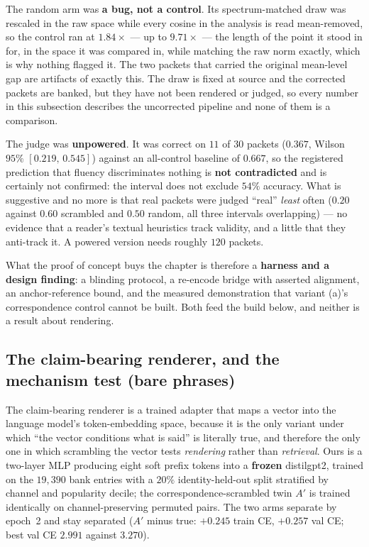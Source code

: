 \documentclass[11pt]{article}
\begin{document}
The random arm was \textbf{a bug, not a control}. Its spectrum-matched draw was rescaled in the raw
space while every cosine in the analysis is read mean-removed, so the control ran at $1.84\times$ ---
up to $9.71\times$ --- the length of the point it stood in for, in the space it was compared in, while
matching the raw norm exactly, which is why nothing flagged it. The two packets that carried the
original mean-level gap are artifacts of exactly this. The draw is fixed at source and the corrected
packets are banked, but they have not been rendered or judged, so every number in this subsection
describes the uncorrected pipeline and none of them is a comparison.

The judge was \textbf{unpowered}. It was correct on $11$ of $30$ packets ($0.367$, Wilson $95\%$
$[0.219,\,0.545]$) against an all-control baseline of $0.667$, so the registered prediction that
fluency discriminates nothing is \textbf{not contradicted} and is certainly not confirmed: the
interval does not exclude $54\%$ accuracy. What is suggestive and no more is that real packets were
judged ``real'' \emph{least} often ($0.20$ against $0.60$ scrambled and $0.50$ random, all three
intervals overlapping) --- no evidence that a reader's textual heuristics track validity, and a little
that they anti-track it. A powered version needs roughly $120$ packets.

What the proof of concept buys the chapter is therefore a \textbf{harness and a design finding}: a
blinding protocol, a re-encode bridge with asserted alignment, an anchor-reference bound, and the
measured demonstration that variant (a)'s correspondence control cannot be built. Both feed the build
below, and neither is a result about rendering.

\subsection{The claim-bearing renderer, and the mechanism test (bare phrases)}
\label{sec:c3b1}

The claim-bearing renderer is a trained adapter that maps a vector into the language model's
token-embedding space, because it is the only variant under which ``the vector conditions what is
said'' is literally true, and therefore the only one in which scrambling the vector tests
\emph{rendering} rather than \emph{retrieval}. Ours is a two-layer MLP producing eight soft prefix
tokens into a \textbf{frozen} distilgpt2, trained on the $19{,}390$ bank entries with a $20\%$
identity-held-out split stratified by channel and popularity decile; the correspondence-scrambled
twin $A'$ is trained identically on channel-preserving permuted pairs. The two arms separate by
epoch~2 and stay separated ($A'$ minus true: $+0.245$ train CE, $+0.257$ val CE; best val CE $2.991$
against $3.270$).
\end{document}
